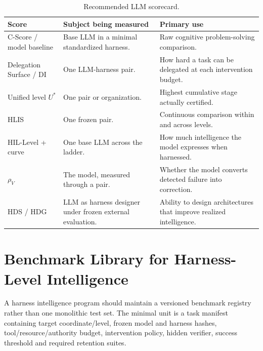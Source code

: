 \documentclass[11pt]{article}
\theoremstyle{definition}
\newcommand{\rhov}{\ensuremath{\rho_V}}
\begin{document}
\begin{table}[H]
\centering\small
\begin{tabularx}{\textwidth}{@{}lYY@{}}
\toprule
Score & Subject being measured & Primary use \\
\midrule
C-Score / model baseline & Base LLM in a minimal standardized harness. & Raw cognitive problem-solving comparison. \\
Delegation Surface / DI & One LLM-harness pair. & How hard a task can be delegated at each intervention budget. \\
Unified level $U^{*}$ & One pair or organization. & Highest cumulative stage actually certified. \\
HLIS & One frozen pair. & Continuous comparison within and across levels. \\
HIL-Level + curve & One base LLM across the ladder. & How much intelligence the model expresses when harnessed. \\
\rhov{} & The model, measured through a pair. & Whether the model converts detected failure into correction. \\
HDS / HDG & LLM as harness designer under frozen external evaluation. & Ability to design architectures that improve realized intelligence. \\
\bottomrule
\end{tabularx}
\caption{Recommended LLM scorecard.}
\label{tab:scorecard}
\end{table}

\section{Benchmark Library for Harness-Level Intelligence}

A harness intelligence program should maintain a versioned benchmark registry rather than one monolithic test set. The minimal unit is a task manifest containing target coordinate/level, frozen model and harness hashes, tool/resource/authority budget, intervention policy, hidden verifier, success threshold and required retention suites.
\end{document}
